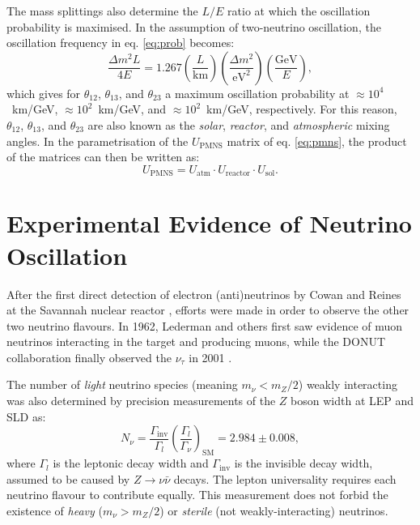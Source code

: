 The mass splittings also determine the $L/E$ ratio at which the oscillation probability is maximised. In the assumption of two-neutrino oscillation, the oscillation frequency in eq. \eqref{eq:prob} becomes:
\begin{equation}
     \frac{\Delta m^{2}L}{4E} = 1.267\left(\frac{L}{\mathrm{km}}\right)\left(\frac{\Delta m^2}{\mathrm{eV}^2}\right)\left(\frac{\mathrm{GeV}}{E}\right),
\end{equation} 
which gives for $\theta_{12}$, $\theta_{13}$, and $\theta_{23}$ a maximum oscillation probability at $\approx 10^4$~km/GeV, $\approx 10^2$~km/GeV, and $\approx 10^2$~km/GeV, respectively. For this reason, $\theta_{12}$, $\theta_{13}$, and $\theta_{23}$ are also known as the \emph{solar}, \emph{reactor}, and \emph{atmospheric} mixing angles. In the parametrisation of the $U_{\mathrm{PMNS}}$ matrix of eq. \eqref{eq:pmns}, the product of the matrices can then be written as:
\begin{equation}
    U_{\mathrm{PMNS}} = U_{\mathrm{atm}} \cdot U_{\mathrm{reactor}} \cdot U_{\mathrm{sol}}.
\end{equation}



\section{Experimental Evidence of Neutrino Oscillation}
After the first direct detection of electron (anti)neutrinos by Cowan and Reines at the Savannah nuclear reactor \cite{Cowan:1992xc}, efforts were made in order to observe the other two neutrino flavours.
In 1962, Lederman and others \cite{PhysRevLett.9.36} first saw evidence of muon neutrinos interacting in the target and producing muons, while the DONUT collaboration finally observed the $\nu_{\tau}$ in 2001 \cite{Kodama:2000mp}.

The number of \emph{light} neutrino species (meaning $m_{\nu} < m_{Z}/2$) weakly interacting was also determined by precision measurements of the $Z$ boson width at LEP and SLD \cite{ALEPH:2005ab} as:
\begin{equation}
   N_{\nu} = \frac{\Gamma_{\mathrm{inv}}}{\Gamma_l}
   \left(\frac{\Gamma_{l}}{\Gamma_{\nu}}\right)_{\mathrm{SM}}=2.984\pm0.008,
\end{equation}
where $\Gamma_{l}$ is the leptonic decay width and $\Gamma_{\mathrm{inv}}$ is the invisible decay width, assumed to be caused by $Z\rightarrow\nu\bar{\nu}$ decays. The lepton universality requires each neutrino flavour to contribute equally. This measurement does not forbid the existence of \emph{heavy} ($m_{\nu} > m_{Z}/2$) or \emph{sterile} (not weakly-interacting) neutrinos.

